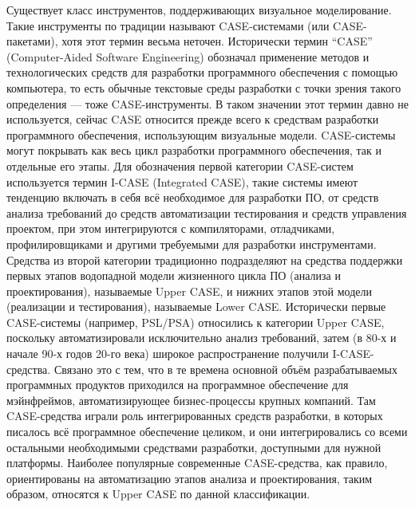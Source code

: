 Существует класс инструментов, поддерживающих визуальное моделирование. 
Такие инструменты по традиции называют CASE-системами (или CASE-пакетами), 
хотя этот термин весьма неточен. Исторически термин "`CASE"' 
(Computer-Aided Software Engineering) обозначал применение методов и 
технологических средств для разработки программного обеспечения с помощью 
компьютера, то есть обычные текстовые среды разработки с точки зрения такого 
определения --- тоже CASE-инструменты. В таком значении этот термин давно не 
используется, сейчас CASE относится прежде всего к средствам разработки 
программного обеспечения, использующим визуальные модели. CASE-системы могут 
покрывать как весь цикл разработки программного обеспечения, так и отдельные 
его этапы. Для обозначения первой категории CASE-систем используется термин 
I-CASE (Integrated CASE), такие системы имеют тенденцию включать в себя всё 
необходимое для разработки ПО, от средств анализа требований до средств 
автоматизации тестирования и средств управления проектом, при этом интегрируются 
с компиляторами, отладчиками, профилировщиками и другими требуемыми для 
разработки инструментами. Средства из второй категории традиционно подразделяют 
на средства поддержки первых этапов водопадной модели жизненного цикла ПО 
(анализа и проектирования), называемые Upper CASE, и нижних этапов этой модели 
(реализации и тестирования), называемые Lower CASE. Исторически первые 
CASE-системы (например, PSL/PSA) относились к категории Upper CASE, поскольку 
автоматизировали исключительно анализ требований, затем 
(в 80-х и начале 90-х годов 20-го века) широкое распространение получили 
I-CASE-средства. Связано это с тем, что в те времена основной объём 
разрабатываемых программных продуктов приходился на программное обеспечение для 
мэйнфреймов, автоматизирующее бизнес-процессы крупных компаний. Там 
CASE-средства играли роль интегрированных средств разработки, в которых 
писалось всё программное обеспечение целиком, и они интегрировались со всеми 
остальными необходимыми средствами разработки, доступными для нужной платформы. 
Наиболее популярные современные CASE-средства, как правило, ориентированы на 
автоматизацию этапов анализа и проектирования, таким образом, относятся к 
Upper CASE по данной классификации.

